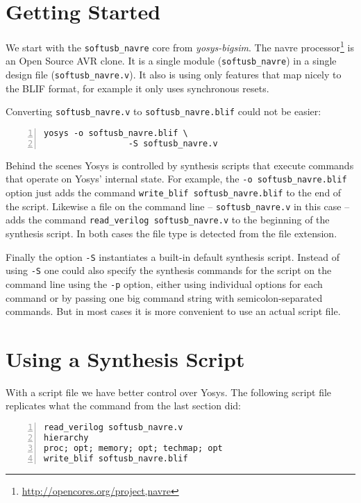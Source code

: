 \section{Getting Started}

We start with the {\tt softusb\_navre} core from {\it yosys-bigsim}. The navre
processor\footnote{\url{http://opencores.org/project,navre}} is an Open Source
AVR clone. It is a single module ({\tt softusb\_navre}) in a single design file
({\tt softusb\_navre.v}). It also is using only features that map nicely to
the BLIF format, for example it only uses synchronous resets.

Converting {\tt softusb\_navre.v} to {\tt softusb\_navre.blif} could not be
easier:

\begin{lstlisting}[frame=trBL,xleftmargin=1.5em,numbers=left]
  yosys -o softusb_navre.blif \
                 -S softusb_navre.v
\end{lstlisting}

Behind the scenes Yosys is controlled by synthesis scripts that execute
commands that operate on Yosys' internal state. For example, the {\tt -o
softusb\_navre.blif} option just adds the command {\tt write\_blif
softusb\_navre.blif} to the end of the script. Likewise a file on the
command line -- {\tt softusb\_navre.v} in this case -- adds the command
{\tt read\_verilog softusb\_navre.v} to the beginning of the
synthesis script. In both cases the file type is detected from the
file extension.

Finally the option {\tt -S} instantiates a built-in default synthesis script.
Instead of using {\tt -S} one could also specify the synthesis commands
for the script on the command line using the {\tt -p} option, either using
individual options for each command or by passing one big command string
with semicolon-separated commands. But in most cases it is more convenient
to use an actual script file.

\section{Using a Synthesis Script}

With a script file we have better control over Yosys. The following script
file replicates what the command from the last section did:

\begin{lstlisting}[frame=trBL,xleftmargin=2em,numbers=left]
read_verilog softusb_navre.v
hierarchy
proc; opt; memory; opt; techmap; opt
write_blif softusb_navre.blif
\end{lstlisting}

